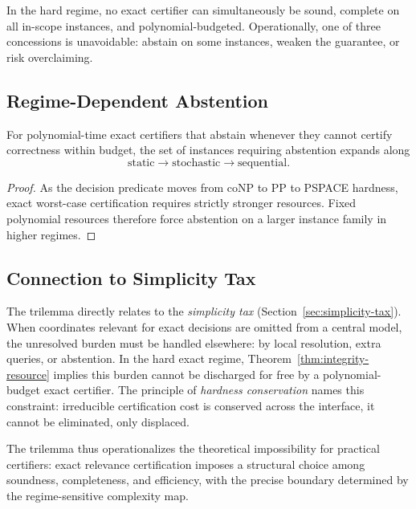 \begin{corollary}
In the hard regime, no exact certifier can simultaneously be sound, complete on all in-scope instances, and polynomial-budgeted. Operationally, one of three concessions is unavoidable: abstain on some instances, weaken the guarantee, or risk overclaiming.
\end{corollary}

\subsection{Regime-Dependent Abstention}

\begin{proposition}\label{prop:abstention-frontier}
For polynomial-time exact certifiers that abstain whenever they cannot certify correctness within budget, the set of instances requiring abstention expands along
\[
\text{static} \to \text{stochastic} \to \text{sequential}.
\]
\end{proposition}

\begin{proof}
As the decision predicate moves from coNP to PP to PSPACE hardness, exact worst-case certification requires strictly stronger resources. Fixed polynomial resources therefore force abstention on a larger instance family in higher regimes.
\end{proof}

\subsection{Connection to Simplicity Tax}

The trilemma directly relates to the \emph{simplicity tax} (Section~\ref{sec:simplicity-tax}). When coordinates relevant for exact decisions are omitted from a central model, the unresolved burden must be handled elsewhere: by local resolution, extra queries, or abstention. In the hard exact regime, Theorem~\ref{thm:integrity-resource} implies this burden cannot be discharged for free by a polynomial-budget exact certifier. The principle of \emph{hardness conservation} names this constraint: irreducible certification cost is conserved across the interface, it cannot be eliminated, only displaced.

The trilemma thus operationalizes the theoretical impossibility for practical certifiers: exact relevance certification imposes a structural choice among soundness, completeness, and efficiency, with the precise boundary determined by the regime-sensitive complexity map.